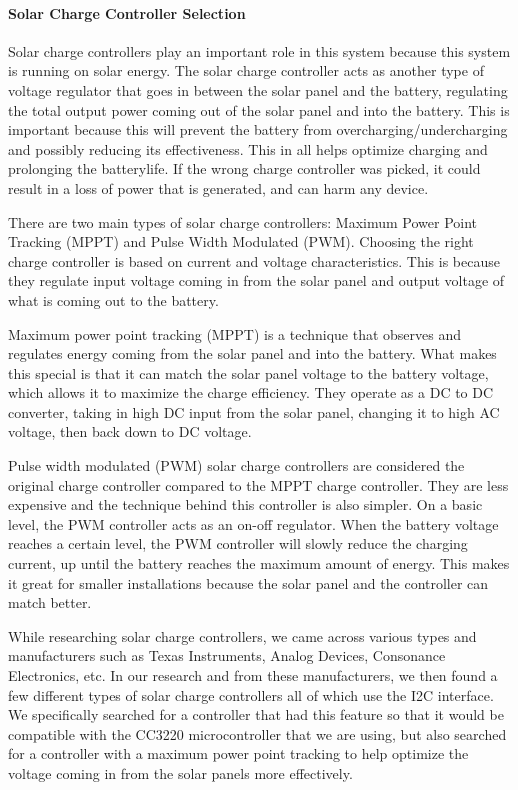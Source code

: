 \paragraph{Solar Charge Controller Selection}
Solar charge controllers play an important role in this system because this system is running on solar energy. The solar charge controller acts as another type of voltage regulator that goes in between the solar panel and the battery, regulating the total output power coming out of the solar panel and into the battery. This is important because this will prevent the battery from overcharging/undercharging and possibly reducing its effectiveness. This in all helps optimize charging and prolonging the batterylife. If the wrong charge controller was picked, it could result in a loss of power that is generated, and can harm any device. \par
There are two main types of solar charge controllers: Maximum Power Point Tracking (MPPT) and Pulse Width Modulated (PWM). Choosing the right charge controller is based on current and voltage characteristics. This is because they regulate input voltage coming in from the solar panel and output voltage of what is coming out to the battery.\par
Maximum power point tracking (MPPT) is a technique that observes and regulates energy coming from the solar panel and into the battery. What makes this special is that it can match the solar panel voltage to the battery voltage, which allows it to maximize the charge efficiency. They operate as a DC to DC converter, taking in high DC input from the solar panel, changing it to high AC voltage, then back down to DC voltage.\par
Pulse width modulated (PWM) solar charge controllers are considered the original charge controller compared to the MPPT charge controller. They are less expensive and the technique behind this controller is also simpler. On a basic level, the PWM controller acts as an on-off regulator. When the battery voltage reaches a certain level, the PWM controller will slowly reduce the charging current, up until the battery reaches the maximum amount of energy. This makes it great for smaller installations because the solar panel and the controller can match better. \par
While researching solar charge controllers, we came across various types and manufacturers such as Texas Instruments, Analog Devices, Consonance Electronics, etc. In our research and from these manufacturers, we then found a few different types of solar charge controllers all of which use the I2C interface. We specifically searched for a controller that had this feature so that it would be compatible with the CC3220 microcontroller that we are using, but also searched for a controller with a maximum power point tracking to help optimize the voltage coming in from the solar panels more effectively. \par

